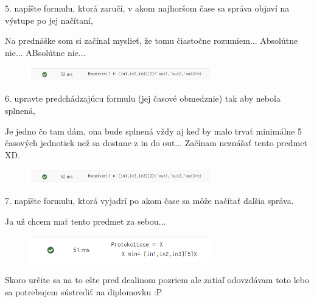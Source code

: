 \documentclass[a4paper]{article}
\begin{document}
5. napíšte formulu, ktorá zaručí, v akom najhoršom čase sa správa objaví na výstupe po jej načítaní, 

Na prednáške som si začínal myslieť, že tomu čiastočne rozumiem... Absolútne nie... ABsolútne nie... 

\begin{figure}[!h]
	\centering
	\includegraphics[width=0.7\textwidth]{5.png}
\end{figure}

6. upravte predchádzajúcu formulu (jej časové obmedznie) tak aby nebola splnená, 

Je jedno čo tam dám, ona bude splnená vždy aj keď by malo trvať minimálne 5 časových jednotiek než sa dostane z in do out... Začínam neznášať tento predmet XD.

\begin{figure}[!h]
	\centering
	\includegraphics[width=0.7\textwidth]{5.png}
\end{figure}

7. napíšte formulu, ktorá vyjadrí po akom čase sa môže načítať ďalšia správa.

Ja už chcem mať tento predmet za sebou...

\begin{figure}[!h]
	\centering
	\includegraphics[width=0.7\textwidth]{7.png}
\end{figure}

Skoro určite sa na to ešte pred dealinom pozriem ale zatiaľ odovzdávam toto lebo sa potrebujem sústrediť na diplomovku :P 
\end{document}
